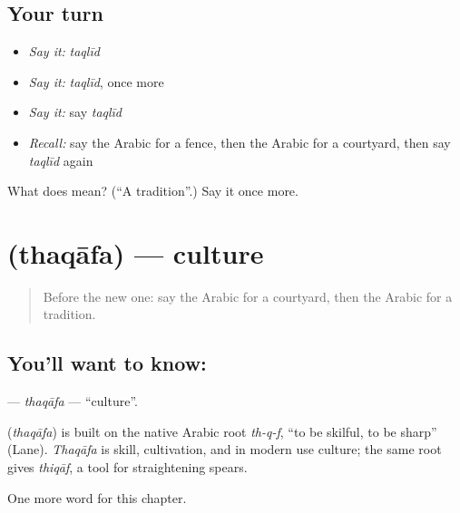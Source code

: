 \subsection*{Your turn}
\begin{itemize}
\raggedright
  \item \emph{Say it:} \emph{taqlīd}
  \item \emph{Say it:} \emph{taqlīd}, once more
  \item \emph{Say it:} say \emph{taqlīd}
  \item \emph{Recall:} say the Arabic for a fence, then the Arabic for a courtyard, then say \emph{taqlīd} again
\end{itemize}

\begin{tcolorbox}[breakable,colback=teal!4,colframe=teal!35!black,title={Before you move on}]
What does  mean? (\textquotedblleft{}A tradition\textquotedblright{}.) Say it once more.
\end{tcolorbox}
\section[\texorpdfstring{\ar{ثقافة} (thaqāfa)}{ثقافة (thaqāfa)}]{ (thaqāfa) — culture}

\label{lesson:AR-C267-thaqafa}



\begin{quote}
Before the new one: say the Arabic for a courtyard, then the Arabic for a tradition.
\end{quote}

\subsection*{You'll want to know: }
\textbf{} — \emph{thaqāfa} — \textquotedblleft{}culture\textquotedblright{}.

\begin{cousinweb}
\textbf{} (\emph{thaqāfa}) is built on the native Arabic root \emph{th-q-f}, \textquotedblleft{}to be skilful, to be sharp\textquotedblright{} (Lane). \emph{Thaqāfa} is skill, cultivation, and in modern use culture; the same root gives \emph{thiqāf}, a tool for straightening spears.
\end{cousinweb}

\begin{grammarlens}[title={What you've built}]
One more word for this chapter.
\end{grammarlens}

